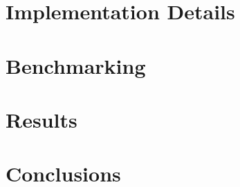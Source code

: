 \documentclass[hidelinks, 12pt]{style}
\begin{document}
\chapter{Implementation Details}\label{implementation_chapter}


\chapter{Benchmarking}\label{benchmarking_chapter}


\chapter{Results}\label{results_chapter}


\chapter{Conclusions}\label{conclusion_chapter}


\newpage

\appendix
\renewcommand{\thesection}{\Alph{section}.\arabic{section}}
\setcounter{section}{0}


\printbibliography[heading = bibintoc]
\end{document}
